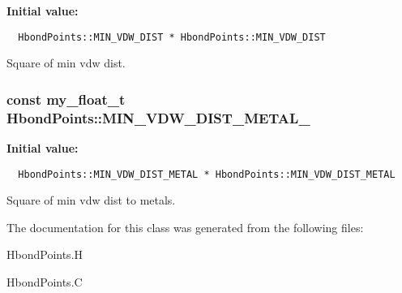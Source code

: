 \textbf{Initial value:}

\begin{Code}\begin{verbatim} 
  HbondPoints::MIN_VDW_DIST * HbondPoints::MIN_VDW_DIST
\end{verbatim}\end{Code}
Square of min vdw dist. 

\subsubsection{\setlength{\rightskip}{0pt plus 5cm}const my\_\-float\_\-t \bf{Hbond\-Points::MIN\_\-VDW\_\-DIST\_\-METAL\_}\hspace{0.3cm}{\tt  [static, private]}}\label{classSimSite3D_1_1HbondPoints_9fbe94d92727f2f547b3cc0bf6b5543a}


\textbf{Initial value:}

\begin{Code}\begin{verbatim} 
  HbondPoints::MIN_VDW_DIST_METAL * HbondPoints::MIN_VDW_DIST_METAL
\end{verbatim}\end{Code}
Square of min vdw dist to metals. 



The documentation for this class was generated from the following files:\begin{CompactItemize}
\item 
Hbond\-Points.H\item 
Hbond\-Points.C\end{CompactItemize}
